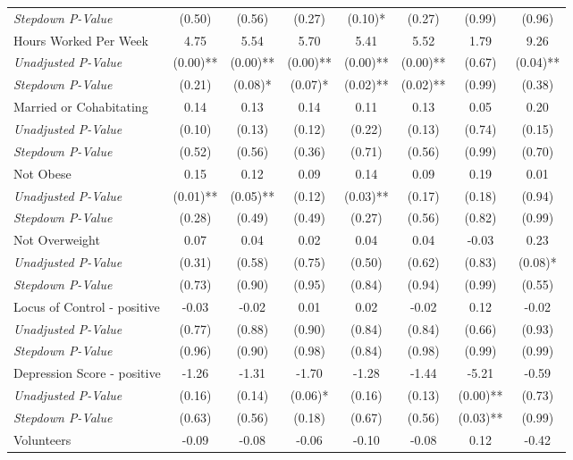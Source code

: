 \begin{tabular}{l c c c c c c c}
\quad \textit{Stepdown P-Value} & (0.50) & (0.56) & (0.27) & (0.10)* & (0.27) & (0.99) & (0.96) \\
Hours Worked Per Week & 4.75 & 5.54 & 5.70 & 5.41 & 5.52 & 1.79 & 9.26 \\
\quad \textit{Unadjusted P-Value} & (0.00)** & (0.00)** & (0.00)** & (0.00)** & (0.00)** & (0.67) & (0.04)** \\
\quad \textit{Stepdown P-Value} & (0.21) & (0.08)* & (0.07)* & (0.02)** & (0.02)** & (0.99) & (0.38) \\
Married or Cohabitating & 0.14 & 0.13 & 0.14 & 0.11 & 0.13 & 0.05 & 0.20 \\
\quad \textit{Unadjusted P-Value} & (0.10) & (0.13) & (0.12) & (0.22) & (0.13) & (0.74) & (0.15) \\
\quad \textit{Stepdown P-Value} & (0.52) & (0.56) & (0.36) & (0.71) & (0.56) & (0.99) & (0.70) \\
Not Obese & 0.15 & 0.12 & 0.09 & 0.14 & 0.09 & 0.19 & 0.01 \\
\quad \textit{Unadjusted P-Value} & (0.01)** & (0.05)** & (0.12) & (0.03)** & (0.17) & (0.18) & (0.94) \\
\quad \textit{Stepdown P-Value} & (0.28) & (0.49) & (0.49) & (0.27) & (0.56) & (0.82) & (0.99) \\
Not Overweight & 0.07 & 0.04 & 0.02 & 0.04 & 0.04 & -0.03 & 0.23 \\
\quad \textit{Unadjusted P-Value} & (0.31) & (0.58) & (0.75) & (0.50) & (0.62) & (0.83) & (0.08)* \\
\quad \textit{Stepdown P-Value} & (0.73) & (0.90) & (0.95) & (0.84) & (0.94) & (0.99) & (0.55) \\
Locus of Control - positive & -0.03 & -0.02 & 0.01 & 0.02 & -0.02 & 0.12 & -0.02 \\
\quad \textit{Unadjusted P-Value} & (0.77) & (0.88) & (0.90) & (0.84) & (0.84) & (0.66) & (0.93) \\
\quad \textit{Stepdown P-Value} & (0.96) & (0.90) & (0.98) & (0.84) & (0.98) & (0.99) & (0.99) \\
Depression Score - positive & -1.26 & -1.31 & -1.70 & -1.28 & -1.44 & -5.21 & -0.59 \\
\quad \textit{Unadjusted P-Value} & (0.16) & (0.14) & (0.06)* & (0.16) & (0.13) & (0.00)** & (0.73) \\
\quad \textit{Stepdown P-Value} & (0.63) & (0.56) & (0.18) & (0.67) & (0.56) & (0.03)** & (0.99) \\
Volunteers & -0.09 & -0.08 & -0.06 & -0.10 & -0.08 & 0.12 & -0.42 \\

\end{tabular}
